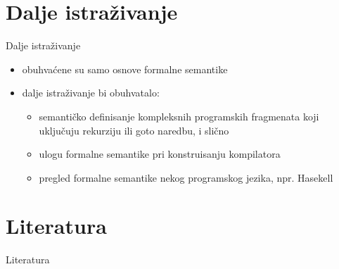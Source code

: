 \documentclass{beamer}
\begin{document}
\section{Dalje istraživanje}
\begin{frame}{Dalje istraživanje}
  \begin{itemize}
  \item obuhvaćene su samo osnove formalne semantike
  \item dalje istraživanje bi obuhvatalo:
  \begin{itemize}
  	 \item semantičko definisanje kompleksnih programskih fragmenata koji uključuju rekurziju ili goto naredbu, i slično
  	 \item ulogu formalne semantike pri konstruisanju kompilatora
  	 \item pregled formalne semantike nekog programskog jezika, npr. Hasekell
  \end{itemize}
  

  \end{itemize}
\end{frame}
\section{Literatura}
\begin{frame}{Literatura}
  
\end{frame}
\end{document}

